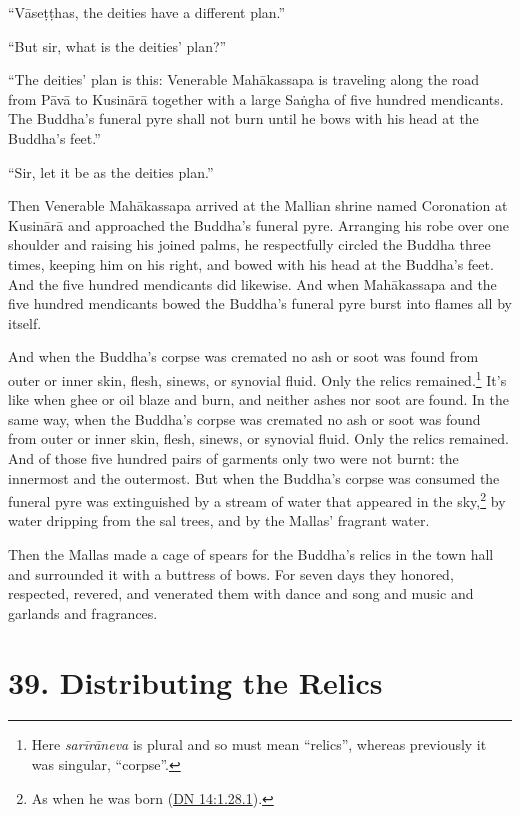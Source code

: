 \documentclass[12pt,openany]{book}%
\begin{document}
“\textsanskrit{Vāseṭṭhas}, the deities have a different plan.” 

“But sir, what is the deities’ plan?” 

“The deities’ plan is this: Venerable \textsanskrit{Mahākassapa} is traveling along the road from \textsanskrit{Pāvā} to \textsanskrit{Kusinārā} together with a large \textsanskrit{Saṅgha} of five hundred mendicants. The Buddha’s funeral pyre shall not burn until he bows with his head at the Buddha’s feet.” 

“Sir, let it be as the deities plan.” 

Then Venerable \textsanskrit{Mahākassapa} arrived at the Mallian shrine named Coronation at \textsanskrit{Kusinārā} and approached the Buddha’s funeral pyre. Arranging his robe over one shoulder and raising his joined palms, he respectfully circled the Buddha three times, keeping him on his right, and bowed with his head at the Buddha’s feet. And the five hundred mendicants did likewise. And when \textsanskrit{Mahākassapa} and the five hundred mendicants bowed the Buddha’s funeral pyre burst into flames all by itself. 

And when the Buddha’s corpse was cremated no ash or soot was found from outer or inner skin, flesh, sinews, or synovial fluid. Only the relics remained.\footnote{Here \textit{\textsanskrit{sarīrāneva}} is plural and so must mean “relics”, whereas previously it was singular, “corpse”. } It’s like when ghee or oil blaze and burn, and neither ashes nor soot are found. In the same way, when the Buddha’s corpse was cremated no ash or soot was found from outer or inner skin, flesh, sinews, or synovial fluid. Only the relics remained. And of those five hundred pairs of garments only two were not burnt: the innermost and the outermost. But when the Buddha’s corpse was consumed the funeral pyre was extinguished by a stream of water that appeared in the sky,\footnote{As when he was born (\href{https://suttacentral.net/dn14/en/sujato\#1.28.1}{DN 14:1.28.1}). } by water dripping from the sal trees, and by the Mallas’ fragrant water. 

Then the Mallas made a cage of spears for the Buddha’s relics in the town hall and surrounded it with a buttress of bows. For seven days they honored, respected, revered, and venerated them with dance and song and music and garlands and fragrances. 

\section*{39. Distributing the Relics }
\end{document}
